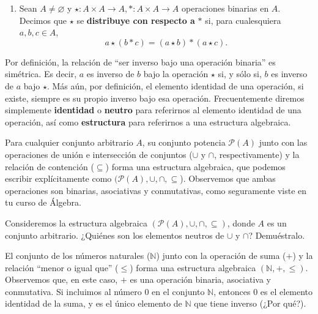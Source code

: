 \documentclass[notasLineal]{subfiles}
\begin{document}
\begin{tcolorbox}[breakable]
\begin{Def}
\begin{enumerate}[label=(\alph*)]
            \item Sean $A\neq \varnothing$ y $\star:A\times A\to A, \ast:A\times A\to A$ operaciones binarias en $A$. Decimos que $\star$ se \textbf{distribuye con respecto a} $\ast$ si, para cualesquiera $a,b,c\in A$, $$a\star(b\ast c) = (a\star b)\ast(a\star c).$$
        \end{enumerate}
    \end{Def}
\end{tcolorbox}
    
\begin{Obs}\label{Obs: Inverso}
    
Por definición, la relación de ``ser inverso bajo una operación binaria'' es simétrica. Es decir, $a$ es inverso de $b$ bajo la operación $\star$ si, y sólo si, $b$ es inverso de $a$ bajo $\star$. Más aún, por definición, el elemento identidad de una operación, si existe, siempre es su propio inverso bajo esa operación. Frecuentemente diremos simplemente \textbf{identidad} o \textbf{neutro} para referirnos al elemento identidad de una operación, así como \textbf{estructura} para referirnos a una estructura algebraica. 
\end{Obs}

\begin{Ejem}\label{Ejem: Estructura algebraica}
    Para cualquier conjunto arbitrario $A$, su conjunto potencia $\mathscr{P}(A)$ junto con las operaciones de unión e intersección de conjuntos ($\cup$ y $\cap$, respectivamente) y la relación  de contención ($\subseteq$) forma una estructura algebraica, que podemos escribir explícitamente como $(\mathscr{P}(A),\cup,\cap,\subseteq$). Observemos que ambas operaciones son binarias, asociativas y conmutativas, como seguramente viste en tu curso de Álgebra.
\end{Ejem}

\begin{Ejer}\label{ejercicio-1}
    Consideremos la estructura algebraica $(\mathscr{P}(A),\cup,\cap,\subseteq)$, donde $A$ es un conjunto arbitrario. ¿Quiénes son los elementos neutros de $\cup$ y $\cap$? Demuéstralo.
\end{Ejer}

El conjunto de los números naturales ($\mathbb{N}$) junto con la operación de suma ($+$) y la relación ``menor o igual que'' ($\le$) forma una estructura algebraica $(\mathbb{N},+,\le)$. Observemos que, en este caso, $+$ es una operación binaria, asociativa y conmutativa. Si incluimos al número $0$ en el conjunto $\mathbb{N}$, entonces $0$ es el elemento identidad de la suma, y es el único elemento de $\mathbb{N}$ que tiene inverso (¿Por qué?).
\end{document}
